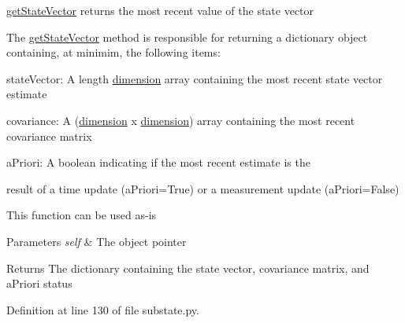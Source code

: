 \hyperlink{classmodest_1_1substates_1_1substate_1_1SubState_aa18c8238415131b4b63cef0e4b2ff9fd}{get\+State\+Vector} returns the most recent value of the state vector 

The \hyperlink{classmodest_1_1substates_1_1substate_1_1SubState_aa18c8238415131b4b63cef0e4b2ff9fd}{get\+State\+Vector} method is responsible for returning a dictionary object containing, at minimim, the following items\+:


\begin{DoxyItemize}
\item \textquotesingle{}state\+Vector\textquotesingle{}\+: A length \hyperlink{classmodest_1_1substates_1_1substate_1_1SubState_ab9027f6d1d7d57c47731612f519b7ee6}{dimension} array containing the most recent state vector estimate
\item \textquotesingle{}covariance\textquotesingle{}\+: A (\hyperlink{classmodest_1_1substates_1_1substate_1_1SubState_ab9027f6d1d7d57c47731612f519b7ee6}{dimension} x \hyperlink{classmodest_1_1substates_1_1substate_1_1SubState_ab9027f6d1d7d57c47731612f519b7ee6}{dimension}) array containing the most recent covariance matrix
\item \textquotesingle{}a\+Priori\textquotesingle{}\+: A boolean indicating if the most recent estimate is the
\item result of a time update (a\+Priori=True) or a measurement update (a\+Priori=False)
\end{DoxyItemize}

This function can be used as-\/is


\begin{DoxyParams}{Parameters}
{\em self} & The object pointer\\
\hline
\end{DoxyParams}
\begin{DoxyReturn}{Returns}
The dictionary containing the state vector, covariance matrix, and a\+Priori status 
\end{DoxyReturn}


Definition at line 130 of file substate.\+py.

